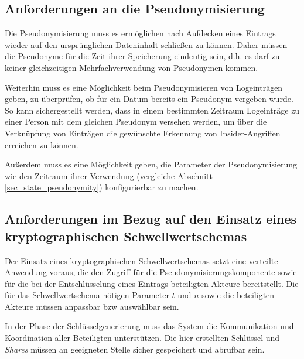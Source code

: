 \subsection*{Anforderungen an die Pseudonymisierung}


Die Pseudonymisierung muss es ermöglichen nach Aufdecken eines Eintrags wieder auf den ursprünglichen Dateninhalt schließen zu können. Daher müssen die Pseudonyme für die Zeit ihrer Speicherung eindeutig sein, d.h. es darf zu keiner gleichzeitigen Mehrfachverwendung von Pseudonymen kommen. 

Weiterhin muss es eine Möglichkeit beim Pseudonymisieren von Logeinträgen geben, zu überprüfen, ob für ein Datum bereits ein Pseudonym vergeben wurde. So kann sichergestellt werden, dass in einem bestimmten Zeitraum Logeinträge zu einer Person mit dem gleichen Pseudonym versehen werden, um über die Verknüpfung von Einträgen die gewünschte Erkennung von Insider-Angriffen erreichen zu können.

Außerdem muss es eine Möglichkeit geben, die Parameter der Pseudonymisierung wie den Zeitraum ihrer Verwendung (vergleiche Abschnitt \ref{sec_state_pseudonymity}) konfigurierbar zu machen.

\subsection*{Anforderungen im Bezug auf den Einsatz eines kryptographischen Schwellwertschemas}



Der Einsatz eines kryptographischen Schwellwertschemas setzt eine verteilte Anwendung voraus, die den Zugriff für die Pseudonymisierungskomponente sowie für die bei der Entschlüsselung eines Eintrags beteiligten Akteure bereitstellt. Die für das Schwellwertschema nötigen Parameter \(t\) und \(n\) sowie die beteiligten Akteure müssen anpassbar bzw auswählbar sein.

In der Phase der Schlüsselgenerierung muss das System die Kommunikation und Koordination aller Beteiligten unterstützen. Die hier erstellten Schlüssel und \textit{Shares} müssen an geeigneten Stelle sicher gespeichert und abrufbar sein.

